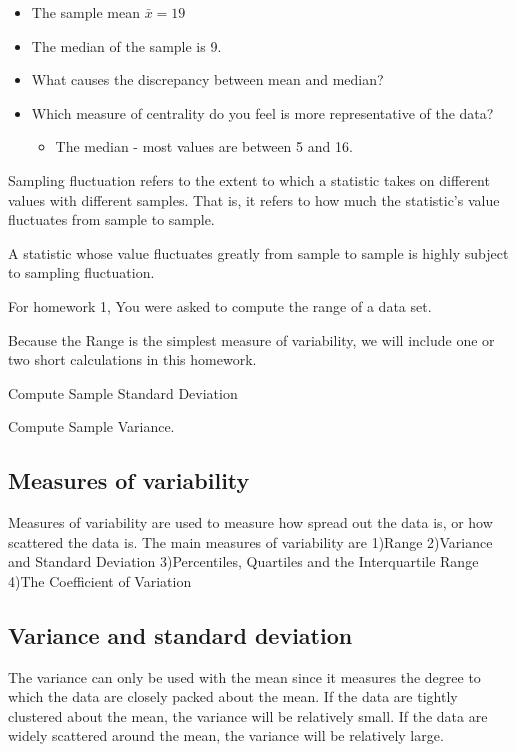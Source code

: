 \documentclass[]{report}
\begin{document}
{\begin{itemize}
\item The sample mean $\bar{x} = 19$
\item The median of the sample is 9.
\item What causes the discrepancy between mean and median?

\item Which measure of centrality do you feel is more representative of the data?
\begin{itemize}
\item The median  - most values are between 5 and 16.
\end{itemize}
\end{itemize}

}

Sampling fluctuation refers to the extent to which a statistic takes on different values with different samples. That is, it refers to how much the statistic's value fluctuates from sample to sample.

A statistic whose value fluctuates greatly from sample to sample is highly subject to sampling fluctuation.





For homework 1, You were asked to compute the range of a data set.

Because the Range is the simplest measure of variability, we will include one or two short calculations in this homework. 

Compute Sample Standard Deviation

Compute Sample Variance.

\subsection{Measures of variability}
Measures of variability are used to measure how spread out the data is, or how scattered the data is. The main measures of variability are
1)Range
2)Variance and Standard Deviation
3)Percentiles, Quartiles and the Interquartile Range
4)The Coefficient of Variation


\subsection{Variance and standard deviation}
The variance can only be used with the mean since it measures the degree to which the data are closely packed about the mean. If the data are tightly clustered about the mean, the variance will be relatively small. If the data are widely scattered around the mean, the variance will be relatively large.
\end{document}
